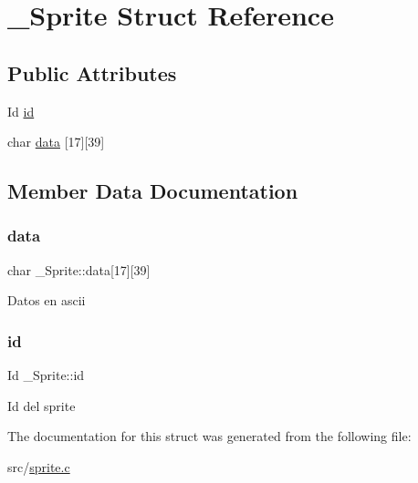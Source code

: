 \hypertarget{struct__Sprite}{}\section{\+\_\+\+Sprite Struct Reference}
\label{struct__Sprite}
\subsection*{Public Attributes}
\begin{DoxyCompactItemize}
\item 
Id \hyperlink{struct__Sprite_ade53af91be4735711bed7748f69fbc2a}{id}
\item 
char \hyperlink{struct__Sprite_add6396519e5c35e3e0d04d8519d5e6c2}{data} \mbox{[}17\mbox{]}\mbox{[}39\mbox{]}
\end{DoxyCompactItemize}


\subsection{Member Data Documentation}
\mbox{\label{struct__Sprite_add6396519e5c35e3e0d04d8519d5e6c2}} 
\subsubsection{\texorpdfstring{data}{data}}
{\footnotesize\ttfamily char \+\_\+\+Sprite\+::data\mbox{[}17\mbox{]}\mbox{[}39\mbox{]}}

Datos en ascii \mbox{\label{struct__Sprite_ade53af91be4735711bed7748f69fbc2a}} 
\subsubsection{\texorpdfstring{id}{id}}
{\footnotesize\ttfamily Id \+\_\+\+Sprite\+::id}

Id del sprite 

The documentation for this struct was generated from the following file\+:\begin{DoxyCompactItemize}
\item 
src/\hyperlink{sprite_8c}{sprite.\+c}\end{DoxyCompactItemize}
